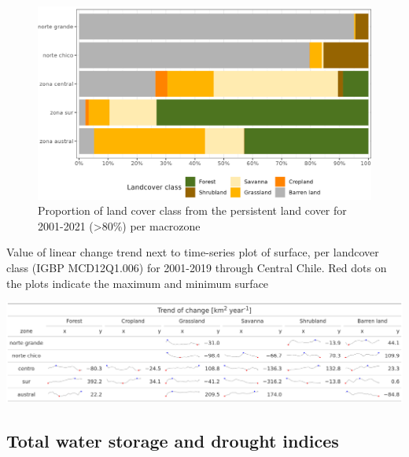 \documentclass[
  number,
  preprint,
  3p]{elsarticle}
\begin{document}
\begin{figure}[!ht]

{\centering \includegraphics{../output/figs/LC_pers80_per_macrozone.png}

}

\caption{Proportion of land cover class from the persistent land cover
for 2001-2021 (\textgreater80\%) per macrozone}

\end{figure}

\begin{table}[!ht]
\caption{Value of linear change trend next to time-series plot of surface, per landcover class (IGBP MCD12Q1.006) for 2001-2019 through Central Chile. Red dots on the plots indicate the maximum and minimum surface}
\includegraphics[]{../output/figs/table_var_landcover_macro.png}
\end{table}

\hypertarget{total-water-storage-and-drought-indices}{%
\subsection{Total water storage and drought
indices}\label{total-water-storage-and-drought-indices}}
\end{document}
